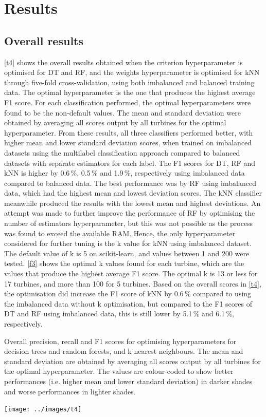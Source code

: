 \chapter{Results}\label{c3}

\section{Overall results}

\autoref{t4} shows the overall results obtained when the criterion hyperparameter is optimised for DT and RF, and the weights hyperparameter is optimised for kNN through five-fold cross-validation, using both imbalanced and balanced training data. The optimal hyperparameter is the one that produces the highest average F1 score. For each classification performed, the optimal hyperparameters were found to be the non-default values. The mean and standard deviation were obtained by averaging all scores output by all turbines for the optimal hyperparameter. From these results, all three classifiers performed better, with higher mean and lower standard deviation scores, when trained on imbalanced datasets using the multilabel classification approach compared to balanced datasets with separate estimators for each label. The F1 scores for DT, RF and kNN is higher by 0.6\,\%, 0.5\,\% and 1.9\,\%, respectively using imbalanced data compared to balanced data. The best performance was by RF using imbalanced data, which had the highest mean and lowest deviation scores. The kNN classifier meanwhile produced the results with the lowest mean and highest deviations. An attempt was made to further improve the performance of RF by optimising the number of estimators hyperparameter, but this was not possible as the process was found to exceed the available RAM. Hence, the only hyperparameter considered for further tuning is the k value for kNN using imbalanced dataset. The default value of k is 5 on scikit-learn, and values between 1 and 200 were tested. \autoref{f3} shows the optimal k values found for each turbine, which are the values that produce the highest average F1 score. The optimal k is 13 or less for 17 turbines, and more than 100 for 5 turbines. Based on the overall scores in \autoref{t4}, the optimisation did increase the F1 score of kNN by 0.6\,\% compared to using the imbalanced data without k optimisation, but compared to the F1 scores of DT and RF using imbalanced data, this is still lower by 5.1\,\% and 6.1\,\%, respectively.

\begin{table}
  \centering
  \caption{\label{t4}Overall precision, recall and F1 scores for optimising hyperparameters for decision trees and random forests, and k nearest neighbours. The mean and standard deviation are obtained by averaging all scores output by all turbines for the optimal hyperparameter. The values are colour-coded to show better performances (i.e. higher mean and lower standard deviation) in darker shades and worse performances in lighter shades.}
  \texttt{[image: ../images/t4]}
\end{table}

